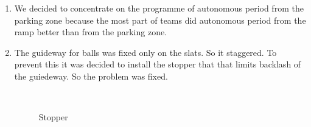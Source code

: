 \begin{enumerate}
	\item We decided to concentrate on the programme of autonomous period from the parking zone because the most part of teams did autonomous period from the ramp better than from the parking zone.
	
		\item The guideway for balls was fixed only on the slats. So it staggered. To prevent this it was decided to install the stopper that that limits backlash of the guiedeway. So the problem was fixed.
	\begin{figure}[H]
		\begin{minipage}[h]{0.2\linewidth}
			\center  
		\end{minipage}
		\begin{minipage}[h]{0.6\linewidth}
			\caption{Stopper}
		\end{minipage}
	\end{figure}
	
\end{enumerate}
\fillpage
